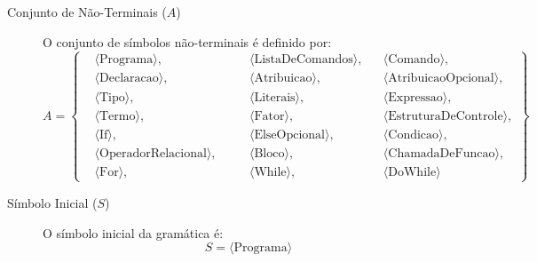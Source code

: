 \documentclass[12pt,a4paper]{article}
\newcommand{\nt}[1]{\ensuremath{\langle\text{#1}\rangle}}
\begin{document}
\begin{description}
    \item[Conjunto de Não-Terminais ($A$)] 
    O conjunto de símbolos não-terminais é definido por:
    \[
    A = \left\{
        \begin{alignedat}{3}
        & \nt{Programa}, && \nt{ListaDeComandos}, && \nt{Comando}, \\
        & \nt{Declaracao}, && \nt{Atribuicao}, && \nt{AtribuicaoOpcional}, \\
        & \nt{Tipo}, && \nt{Literais}, && \nt{Expressao}, \\
        & \nt{Termo}, && \nt{Fator}, && \nt{EstruturaDeControle}, \\
        & \nt{If}, && \nt{ElseOpcional}, && \nt{Condicao}, \\
        & \nt{OperadorRelacional}, \quad && \nt{Bloco}, && \nt{ChamadaDeFuncao}, \\
        & \nt{For}, && \nt{While}, && \nt{DoWhile}
        \end{alignedat}
    \right\}
    \]

    \item[Símbolo Inicial ($S$)] 
    O símbolo inicial da gramática é:
    \[
    S = \nt{Programa}
    \]
\end{description}
\end{document}
